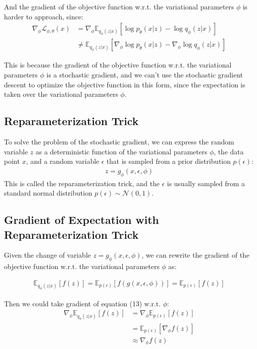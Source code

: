 \documentclass[11pt]{article}
\theoremstyle{definition}
\begin{document}
And the gradient of the objective function w.r.t. the variational parameters $\phi$ is harder to approach, since:
\begin{align}
    \nabla_\phi \mathcal{L}_{\phi, \theta}(x) &= \nabla_\phi\mathbb{E}_{q_\phi(z|x)}[\log p_\theta(x|z) - \log q_\phi(z|x)]\\
    &\neq \mathbb{E}_{q_\phi(z|x)}[\nabla_\phi\log p_\theta(x|z) - \nabla_\phi\log q_\phi(z|x)]
\end{align}

This is because the gradient of the objective function w.r.t. the variational parameters $\phi$ is a stochastic gradient, and we can't use the stochastic gradient descent to optimize the objective function in this form, since the expectation is taken over the variational parameters $\phi$.

\subsection{Reparameterization Trick}

To solve the problem of the stochastic gradient, we can express the random variable $z$ as a deterministic function of the variational parameters $\phi$, the data point $x$, and a random variable $\epsilon$ that is sampled from a prior distribution $p(\epsilon)$:
\begin{align}
    z=g_\phi(x, \epsilon, \phi)
\end{align}
This is called the reparameterization trick, and the $\epsilon$ is usually sampled from a standard normal distribution $p(\epsilon) \sim \mathcal{N}(0, 1)$.

\newpage
\subsection{Gradient of Expectation with Reparameterization Trick}

Given the change of variable $z=g_\phi(x, \epsilon, \phi)$, we can rewrite the gradient of the objective function w.r.t. the variational parameters $\phi$ as:

\begin{align}
    \mathbb{E}_{q_\phi(z|x)}[f(z)] = \mathbb{E}_{p(\epsilon)}[f(g(x, \epsilon, \phi))] = \mathbb{E}_{p(\epsilon)}[f(z)]
\end{align}

Then we could take gradient of equation (13) w.r.t. $\phi$:
\begin{align}
    \nabla_\phi \mathbb{E}_{q_\phi(z|x)}[f(z)] &= \nabla_\phi \mathbb{E}_{p(\epsilon)}[f(z)]\\
    &= \mathbb{E}_{p(\epsilon)}[\nabla_\phi f(z)]\\
    &\approx \nabla_\phi f(z)
\end{align}
\end{document}

